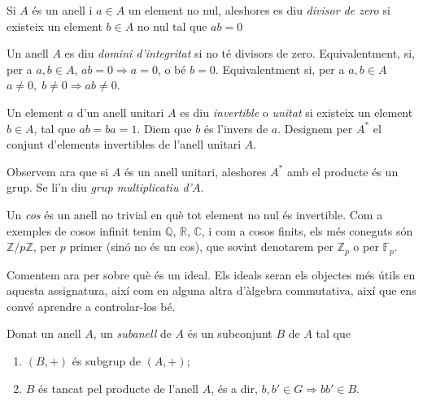 \documentclass[../main.tex]{subfiles}
\begin{document}
\begin{defi}
\label{def:divisorzero} Si $A$ és un anell i $a\in A$ un element no nul, aleshores es diu \textit{divisor de zero} si existeix un element $b\in A$ no nul tal que $ab = 0$
\end{defi}

\begin{defi}
\label{def:dominidintegritat} Un anell $A$ es diu \textit{domini d'integritat} si no té divisors de zero. Equivalentment, si, per a $a,b\in A$, $ab = 0\Rightarrow a=0$, o bé $b=0$. Equivalentment si, per a $a,b\in A$ $a\not=0,\;b\not=0\Rightarrow ab\not=0$.
\end{defi}

\begin{defi}
\label{def:invertibleounitat} Un element $a$ d'un anell unitari $A$ es diu \textit{invertible} o \textit{unitat} si existeix un element $b\in A$, tal que $ab = ba = 1$. Diem que $b$ és l'invers de $a$. Designem per $A^*$ el conjunt d'elements invertibles de l'anell unitari $A$.
\end{defi}

Observem ara que si $A$ és un anell unitari, aleshores $A^*$ amb el producte és un grup. Se li'n diu \textit{grup multiplicatiu d'$A$}\label{def:grupmultiplicatiu}.

\begin{defi}
[Cos]\label{def:cos} Un \textit{cos} és un anell no trivial en què tot element no nul és invertible. Com a exemples de cosos infinit tenim $\mathbb{Q}$, $\mathbb{R}$, $\mathbb{C}$, i com a cosos finits, els més coneguts són $\mathbb{Z}/p\mathbb{Z}$, per $p$ primer (sinó no és un cos), que sovint denotarem per $\mathbb{Z}_p$ o per $\mathbb{F}_p$.
\end{defi}


Comentem ara per sobre què és un ideal. Els ideals seran els objectes més útils en aquesta assignatura, així com en alguna altra d'àlgebra commutativa, així que ens convé aprendre a controlar-los bé.

\begin{defi}
[Subanell]\label{def:subanell} Donat un anell $A$, un \textit{subanell} de $A$ és un subconjunt $B$ de $A$ tal que
\begin{enumerate}[(1)]
    \item $(B,+)$ és subgrup de $(A,+)$;
    \item $B$ és tancat pel producte de l'anell $A$, és a dir, $b,b'\in G\Longrightarrow bb'\in B$.
\end{enumerate}
\end{defi}
\end{document}
